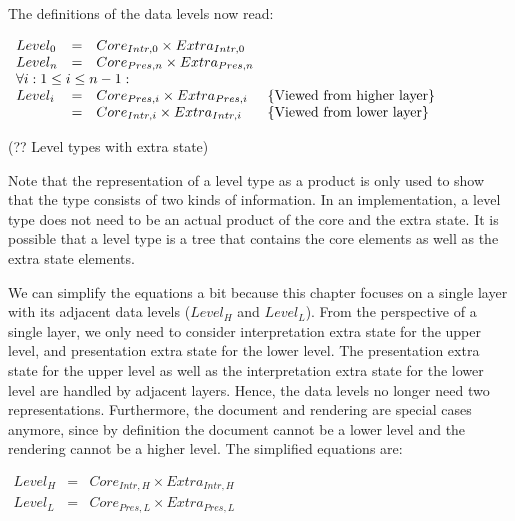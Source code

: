 The definitions of the data levels now read:

\begin{small}\(\begin{array}{lcll}
Level_{0} & = & Core_{Intr,0} \times Extra_{Intr,0}\\
Level_{n} & = & Core_{Pres,n} \times Extra_{Pres,n}\\
\lefteqn{\forall i:1 \le i \le n-1:}  \\
Level_{i}  & = & Core_{Pres,i} \times Extra_{Pres,i}     & \text{\{Viewed from higher layer\}}\\
                & = & Core_{Intr,i} \times Extra_{Intr,i} &  \text{\{Viewed from lower layer\}}\\
\end{array}\)\end{small}
\begin{center}(?? Level types with extra state)\end{center}\vspace{1em}

Note that the representation of a level type as a product is only used to show that the type consists of two kinds of information. In an implementation, a level type does not need to be an actual product of the core and the extra state. It is possible that a level type is a tree that contains the core elements as well as the extra state elements.

We can simplify the equations a bit because this chapter focuses on a single layer with its adjacent data levels ($Level_{H}$ and $Level_{L}$). From the perspective of a single layer, we only need to consider interpretation extra state for the upper level, and presentation extra state for the lower level. The presentation extra state for the upper level as well as the interpretation extra state for the lower level are handled by adjacent layers. Hence, the data levels no longer need two representations. Furthermore, the document and rendering are special cases anymore, since by definition the document cannot be a lower level and the rendering cannot be a higher level. The simplified equations are:

\begin{small}\( \begin{array}{lcll}
Level_{H} & = & Core_{Intr, H} \times Extra_{Intr, H}\\
Level_{L} & = & Core_{Pres, L} \times Extra_{Pres, L}\\
\end{array}\)\end{small}

